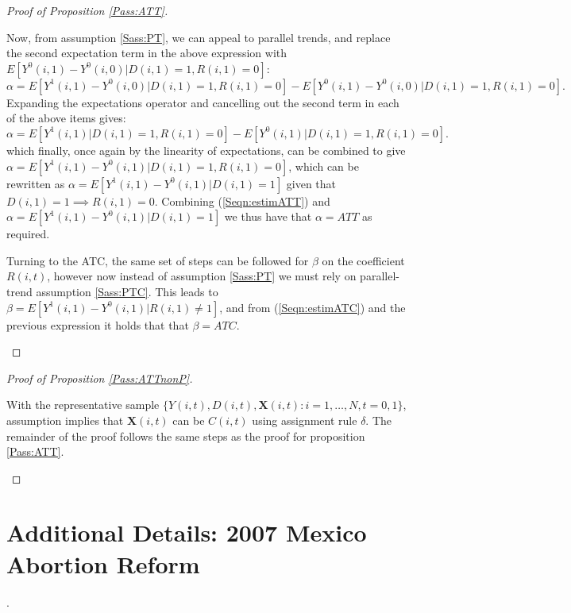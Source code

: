 \begin{proof}[Proof of Proposition \ref{Pass:ATT}]
\begin{footnotesize}
Now, from assumption \ref{Sass:PT}, we can appeal to parallel trends, and 
replace the second expectation term in the above expression with $E
[Y^0(i,1)-Y^0(i,0)|D(i,1)=1,R(i,1)=0]$:
\begin{equation}
\nonumber
\label{Seqn:alphaProof4}
\alpha=E[Y^1(i,1)-Y^0(i,0)|D(i,1)=1,R(i,1)=0] - E[Y^0(i,1)-Y^0(i,0)|D(i,1)=1,R(i,1)=0].
\end{equation}
Expanding the expectations operator and cancelling out the second term in each of
the above items gives:
\begin{equation}
\nonumber
\label{Seqn:alphaProof5}
\alpha=E[Y^1(i,1)|D(i,1)=1,R(i,1)=0] - E[Y^0(i,1)|D(i,1)=1,R(i,1)=0].
\end{equation}
which finally, once again by the linearity of expectations, can be combined to 
give $\alpha=E[Y^1(i,1)-Y^0(i,1)|D(i,1)=1,R(i,1)=0]$, which can be 
rewritten as $\alpha=E[Y^1(i,1)-Y^0(i,1)|D(i,1)=1]$ given that 
$D(i,1)=1 \implies R(i,1)=0$.  Combining (\ref{Seqn:estimATT}) and $\alpha=
E[Y^1(i,1)-Y^0(i,1)|D(i,1)=1]$ we thus have that $\alpha=ATT$ as 
required.

Turning to the ATC, the same set of steps can be followed for $\beta$ on the 
coefficient $R(i,t)$, however now instead of assumption \ref{Sass:PT} we must
rely on parallel-trend assumption \ref{Sass:PTC}. This leads to $\beta=
E[Y^1(i,1)-Y^0(i,1)|R(i,1)\neq 1]$, and from (\ref{Seqn:estimATC}) 
and the previous expression it holds that that $\beta=ATC$.
\end{footnotesize}
\end{proof}

\begin{proof}[Proof of Proposition \ref{Pass:ATTnonP}]
\begin{footnotesize}
With the representative sample $\{Y(i,t), D(i,t), \mathbf{X}(i,t): i=1, \ldots, N, 
t=0, 1\}$, assumption  implies that $\mathbf{X}(i,t)$ can
be $C(i,t)$ using assignment rule $\delta$.  The remainder of the proof follows
the same steps as the proof for proposition \ref{Pass:ATT}.
\end{footnotesize}
\end{proof}

\clearpage
\section{Additional Details: 2007 Mexico Abortion Reform}
\label{Sscn:MAbort}
\citet{Beckeretal2013}.

